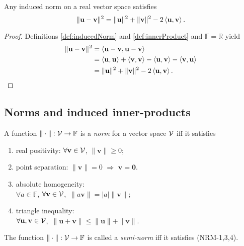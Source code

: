 \begin{thm}
  \label{thm:lawOfCosinesAbstractVersion}
  Any induced norm on a real vector space
  satisfies
  \begin{equation}
    \label{eq:lawOfCosinesAbstractVersion}
    \|\mathbf{u} - \mathbf{v}\|^2
    = \|\mathbf{u}\|^2 + \|\mathbf{v}\|^2 - 2\left\langle \mathbf{u}, \mathbf{v} \right\rangle.
  \end{equation}
\end{thm}
\begin{proof}
  Definitions \ref{def:inducedNorm} and \ref{def:innerProduct}
  and $\mathbb{F}=\mathbb{R}$ yield
  \begin{align*}
    \|\mathbf{u} - \mathbf{v}\|^2
    &= \left\langle \mathbf{u} - \mathbf{v}, \mathbf{u} - \mathbf{v} \right\rangle
    \\
    &= \left\langle \mathbf{u}, \mathbf{u} \right\rangle + \left\langle \mathbf{v}, \mathbf{v} \right\rangle
      - \left\langle \mathbf{u}, \mathbf{v} \right\rangle - \left\langle \mathbf{v}, \mathbf{u} \right\rangle
    \\
    &= \|\mathbf{u}\|^2 + \|\mathbf{v}\|^2 - 2\left\langle \mathbf{u},
      \mathbf{v} \right\rangle. \qedhere
  \end{align*}
\end{proof}

\subsection{Norms and induced inner-products}
\label{sec:normed-vector-spaces}

\begin{defn}
  \label{def:norm}
  A function $\|\cdot\|: {\cal V}\rightarrow\mathbb{F}$
  is a \emph{norm} for a vector space ${\cal V}$ iff it satisfies
  \begin{enumerate}[(NRM-1)]
    \itemsep0em
  \item real positivity: 
    $\forall \mathbf{v}\in{\cal V}$, 
    $\|\mathbf{v}\| \ge 0$;
  \item point separation:
    $\|\mathbf{v}\|=0$ $\Rightarrow$ $\mathbf{v}=\mathbf{0}$.
  \item absolute homogeneity: \\
    $\forall a\in \mathbb{F}$,
    $\forall \mathbf{v}\in{\cal V}$,\ 
    $\|a\mathbf{v}\|=|a|\|\mathbf{v}\|$;
  \item triangle inequality:\\
    $\forall \mathbf{u},\mathbf{v}\in{\cal V}$,\ 
    $\|\mathbf{u}+\mathbf{v}\|\le\|\mathbf{u}\|+\|\mathbf{v}\|$.
  \end{enumerate}
  The function $\|\cdot\|: {\cal V}\rightarrow\mathbb{F}$
  is called a \emph{semi-norm} iff
  it satisfies (NRM-1,3,4).
\end{defn}


